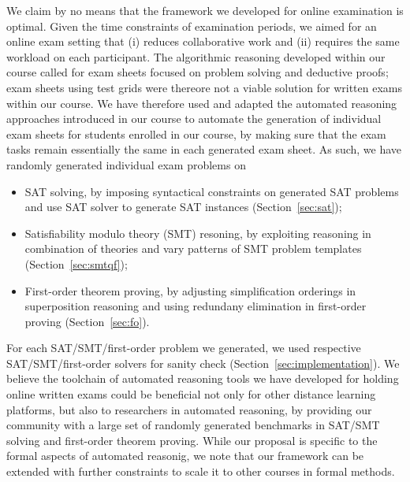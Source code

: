 We claim by no means that the framework we developed for online
examination is optimal.
Given the time constraints of examination periods, we aimed for an
online exam setting that (i) reduces collaborative work and  (ii)
requires the same workload on each participant.
The algorithmic reasoning developed within our
course called for exam sheets focused on problem solving and deductive
proofs;  exam sheets using test grids were thereore not a viable solution
for written exams within our course.
We have therefore used and adapted the automated reasoning approaches introduced in our
course to automate the generation of individual exam sheets for
students enrolled in our course, by making sure that the exam tasks
remain essentially the same in each generated exam sheet. As such, we have randomly generated
individual exam problems on 
\begin{itemize}
\item SAT solving, by imposing syntactical constraints on generated
  SAT problems and use SAT solver to generate SAT instances (Section~\ref{sec:sat}); 
\item Satisfiability modulo theory (SMT) resoning, by exploiting reasoning in combination of theories
  and vary patterns of SMT problem templates (Section~\ref{sec:smtqf}); 
\item First-order theorem proving, by adjusting simplification
  orderings in superposition reasoning and using redundany elimination
  in first-order proving (Section~\ref{sec:fo}). 
\end{itemize}
For each SAT/SMT/first-order problem we generated, we used respective
SAT/SMT/first-order solvers for sanity check (Section~\ref{sec:implementation}).
We believe the toolchain of automated reasoning tools we have developed for
holding online written exams could be beneficial not only for other
distance learning platforms, but also to researchers in automated
reasoning, by providing our community with a large set of randomly generated benchmarks in SAT/SMT solving and first-order theorem proving.
While our proposal is specific to the formal aspects of automated
reasonig, we note that  our framework can be extended with further
constraints to scale it to other courses in formal methods. 


